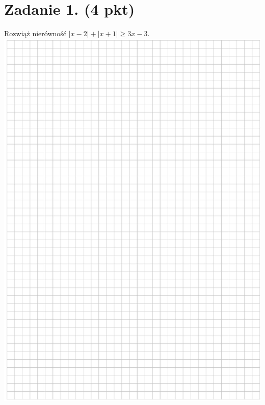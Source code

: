 \documentclass[10pt]{article}
\begin{document}
\section*{Zadanie 1. (4 pkt)}
Rozwiąż nierówność \(|x-2|+|x+1| \geq 3 x-3\).\\
\includegraphics[max width=\textwidth, center]{2024_11_21_d9af6ed2d610d3f2d2cbg-02}\\
\end{document}
